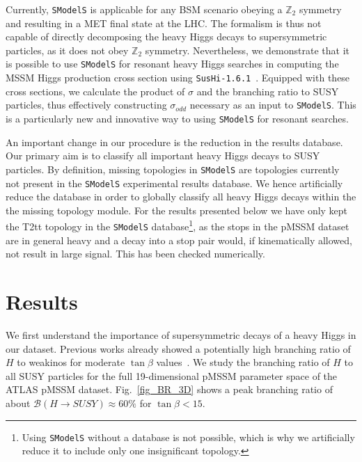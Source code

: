 \documentclass[11pt,a4paper]{article}
\begin{document}
Currently, \texttt{SModelS} is applicable for any BSM scenario obeying a $\mathbb{Z}_2$ symmetry and resulting in a MET final state at the LHC. The formalism is thus not capable of directly decomposing the heavy Higgs decays to supersymmetric particles, as it does not obey $\mathbb{Z}_2$ symmetry. Nevertheless, we demonstrate that it is possible to use \texttt{SModelS} for resonant heavy Higgs searches in computing the MSSM Higgs production cross section using \texttt{SusHi-1.6.1}~\cite{Harlander:2012pb, Harlander:2016hcx}. Equipped with these cross sections, we calculate the product of $\sigma$ and the branching ratio  to SUSY particles, thus effectively constructing 
$\sigma_{odd}$ necessary as an input to \texttt{SModelS}. This is a particularly new and innovative way to using \texttt{SModelS} for resonant searches.

An important change in our procedure is the reduction in the results database. Our primary aim is to classify all important heavy Higgs decays to SUSY particles. By definition, missing topologies in \texttt{SModelS} are topologies currently not present in the \texttt{SModelS} experimental results database. We hence artificially reduce the database in order to globally classify all heavy Higgs decays within the the missing topology module. For the results presented below we have only kept the T2tt topology in the \texttt{SModelS} database\footnote{Using \texttt{SModelS} without a database is not possible, which is why we artificially reduce it to include only one insignificant topology.}, as the stops in the pMSSM dataset are in general heavy and a decay into a stop pair would, if kinematically allowed, not result in large signal. This has been checked numerically.

\section{Results}
\label{sec:results}
We first understand the importance of supersymmetric decays of a heavy Higgs in our dataset. Previous works already showed a potentially high branching ratio of $H$ to weakinos for moderate $\tan\beta$ values~\cite{Barman:2016kgt}. We study the branching ratio of $H$ to all SUSY particles for the full 19-dimensional pMSSM parameter space of the ATLAS pMSSM dataset.  Fig.~\ref{fig_BR_3D} shows a peak branching ratio of about $\mathcal{B}(H\rightarrow SUSY) \approx 60\%$ for $\tan\beta < 15$. 
\end{document}
